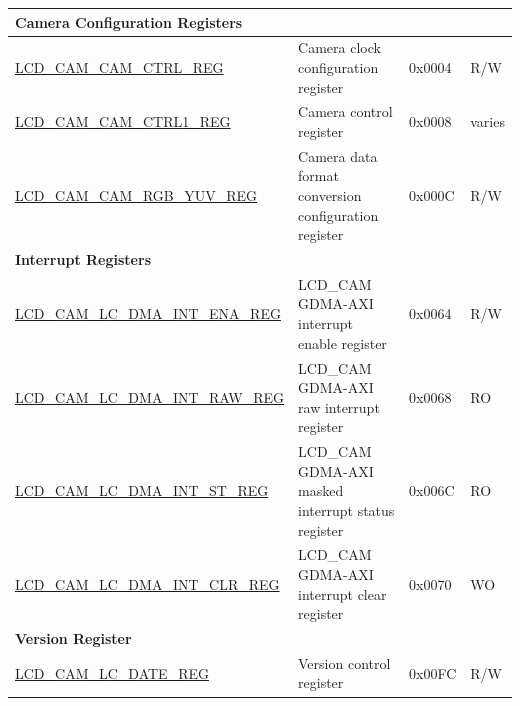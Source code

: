 \begin{longtable}{ | p{6.4cm} | p{6.8cm} | p{1.3cm} | p{1cm} | }
\multicolumn{4}{|l|}{\textbf{Camera Configuration Registers}} \\ \hline
\hyperref[regdesc:LCDCAMCAMCTRLREG]{LCD\_CAM\_CAM\_CTRL\_REG} & Camera clock configuration register & 0x0004 & R/W \\ \hline
\hyperref[regdesc:LCDCAMCAMCTRL1REG]{LCD\_CAM\_CAM\_CTRL1\_REG} & Camera control register  & 0x0008 & varies \\ \hline
\hyperref[regdesc:LCDCAMCAMRGBYUVREG]{LCD\_CAM\_CAM\_RGB\_YUV\_REG} & Camera data format conversion configuration register & 0x000C & R/W \\ \hline
\multicolumn{4}{|l|}{\textbf{Interrupt Registers}} \\ \hline
\hyperref[regdesc:LCDCAMLCDMAINTENAREG]{LCD\_CAM\_LC\_DMA\_INT\_ENA\_REG} & LCD\_CAM GDMA-AXI interrupt enable register & 0x0064 & R/W \\ \hline
\hyperref[regdesc:LCDCAMLCDMAINTRAWREG]{LCD\_CAM\_LC\_DMA\_INT\_RAW\_REG} & LCD\_CAM GDMA-AXI raw interrupt register & 0x0068 & RO \\ \hline
\hyperref[regdesc:LCDCAMLCDMAINTSTREG]{LCD\_CAM\_LC\_DMA\_INT\_ST\_REG} & LCD\_CAM GDMA-AXI masked interrupt status register & 0x006C & RO \\ \hline
\hyperref[regdesc:LCDCAMLCDMAINTCLRREG]{LCD\_CAM\_LC\_DMA\_INT\_CLR\_REG} & LCD\_CAM GDMA-AXI interrupt clear register & 0x0070 & WO \\ \hline
\multicolumn{4}{|l|}{\textbf{Version Register}} \\ \hline
\hyperref[regdesc:LCDCAMLCREGDATEREG]{LCD\_CAM\_LC\_DATE\_REG} & Version control register & 0x00FC & R/W \\ \hline
\end{longtable}
